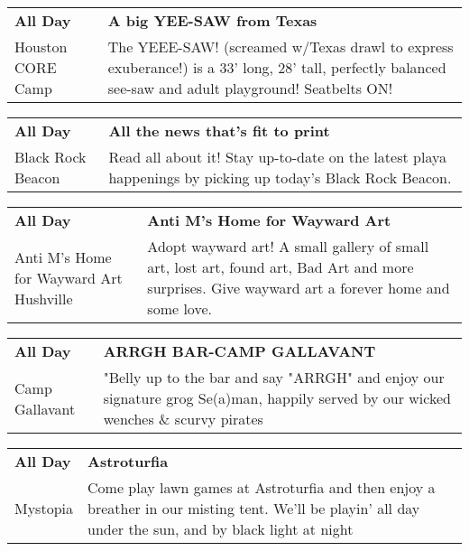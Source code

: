 \begin{tabular}{ p{1in} p{2.2in} }
    \textbf{All Day} & \textbf{A big YEE-SAW from Texas} \\
    Houston CORE Camp \newline  & The YEEE-SAW! (screamed w/Texas drawl to express exuberance!) is a 33' long, 28' tall, perfectly balanced see-saw and adult playground! Seatbelts ON! \\
    \hline 
\end{tabular}
    
\begin{tabular}{ p{1in} p{2.2in} }
    \textbf{All Day} & \textbf{All the news that's fit to print} \\
    Black Rock Beacon \newline  & Read all about it! Stay up-to-date on the latest playa happenings by picking up today's Black Rock Beacon. \\
    \hline 
\end{tabular}
    
\begin{tabular}{ p{1in} p{2.2in} }
    \textbf{All Day} & \textbf{Anti M's Home for Wayward Art} \\
    Anti M's Home for Wayward Art \newline Hushville & Adopt wayward art! A small gallery of small art, lost art, found art, Bad Art and more surprises.  Give wayward art a forever home and some love. \\
    \hline 
\end{tabular}
    
\begin{tabular}{ p{1in} p{2.2in} }
    \textbf{All Day} & \textbf{ARRGH BAR-CAMP GALLAVANT} \\
    Camp Gallavant \newline  & "Belly up to the bar and say "ARRGH" and enjoy our signature grog Se(a)man, happily served by our wicked wenches \& scurvy pirates \\
    \hline 
\end{tabular}
    
\begin{tabular}{ p{1in} p{2.2in} }
    \textbf{All Day} & \textbf{Astroturfia} \\
    Mystopia \newline  & Come play lawn games at Astroturfia and then enjoy a breather in our misting tent. We'll be playin' all day under the sun, and by black light at night \\
    \hline 
\end{tabular}
    
